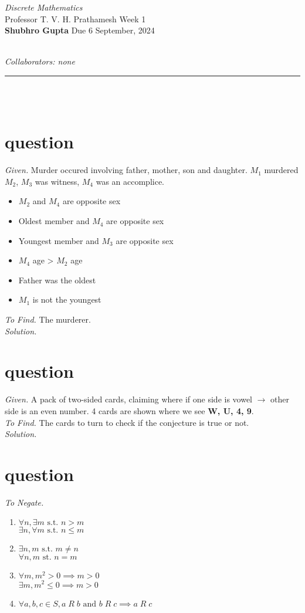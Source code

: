 \documentclass[11pt]{article}
\newcommand{\heading}[5]{
\begin{large}
\noindent\emph{#1}\smallskip ~\\
Professor #3 \hfill Week #2 \smallskip ~\\
\textbf{Shubhro Gupta} \hfill Due #4 ~\\
\end{large} \medskip ~\\
{\emph{Collaborators: #5}}~\\
\hrule
\vspace{50pt}
~\\
}
\begin{document}
\heading{Discrete Mathematics}{1}{T. V. H. Prathamesh}{6 September, 2024}{none}
\\
\section{question}
\emph{Given. } Murder occured involving father, mother, son and daughter. $M_1$ murdered $M_2$, $M_3$ was witness, $M_4$ was an accomplice.
\begin{itemize}
	\item $M_2$ and $M_4$ are opposite sex
	\item Oldest member and $M_4$ are opposite sex
	\item Youngest member and $M_3$ are opposite sex
	\item $M_4$ age > $M_2$ age
	\item Father was the oldest
	\item $M_1$ is not the youngest
\end{itemize}
\emph{To Find. } The murderer. \medskip \\
\emph{Solution. } \\













\section{question}
\emph{Given. } A pack of two-sided cards, claiming where if one side is vowel $\rightarrow$ other side is an even number. 4 cards are shown where we see \textbf{W, U, 4, 9}. \medskip \\
\emph{To Find. } The cards to turn to check if the conjecture is true or not. \medskip \\
\emph{Solution. } \\


\section{question}
\emph{To Negate. }
\begin{enumerate}
	\item $\forall n, \exists m \text{ s.t.  } n > m$ \\
	      $\exists n, \forall m \text{ s.t. } n \leq m$

	\item $\exists n, m \text{ s.t. } m \neq n$ \\
	      $\forall n,m \text{ st.  } n = m$

	\item $\forall m, m^2 > 0 \implies m > 0$ \\
	      $\exists m,m^2 \leq 0 \implies m > 0$

	\item $\forall a, b, c \in S, a\; R\; b \textrm{ and } b\; R\; c \implies a\; R\; c$

\end{enumerate}
\end{document}
